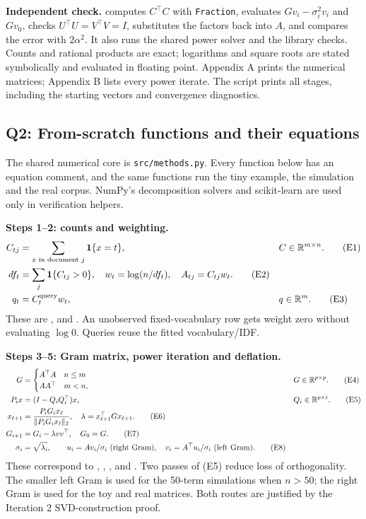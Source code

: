 \textbf{Independent check.}  computes $C^\top C$
with \texttt{Fraction}, evaluates $Gv_i-\sigma_i^2v_i$ and $Gv_0$,
checks $U^\top U=V^\top V=I$, substitutes the factors back into $A$,
and compares the error with $2\alpha^2$. It also runs the shared power
solver and the library checks. Counts and rational products are exact;
logarithms and square roots are stated symbolically and evaluated in
floating point. Appendix A prints the numerical matrices; Appendix B
lists every power iterate. The script prints all stages, including
the starting vectors and convergence diagnostics.

\subsection{Q2: From-scratch functions and their equations}
The shared numerical core is \texttt{src/methods.py}. Every function below
has an equation comment, and the same functions run the tiny example,
the simulation and the real corpus. NumPy's decomposition solvers and
scikit-learn are used only in verification helpers.

\textbf{Steps 1--2: counts and weighting.}
\begin{align}
C_{tj}&=\sum_{x\text{ in document }j}\mathbf1\{x=t\},
&& C\in\mathbb{R}^{m\times n}. \tag{E1}\\
df_t&=\sum_j\mathbf1\{C_{tj}>0\},\quad
w_t=\log(n/df_t),\quad A_{tj}=C_{tj}w_t. \tag{E2}\\
q_t&=C^{\mathrm{query}}_t w_t,
&&q\in\mathbb{R}^m. \tag{E3}
\end{align}
These are ,  and
. An unobserved fixed-vocabulary row gets weight
zero without evaluating $\log0$. Queries reuse the fitted vocabulary/IDF.

\textbf{Steps 3--5: Gram matrix, power iteration and deflation.}
\begin{align}
G&=\begin{cases}A^\top A&n\le m\\AA^\top&m<n,\end{cases}
&&G\in\mathbb{R}^{p\times p}. \tag{E4}\\
P_i x&=(I-Q_iQ_i^\top)x,
&&Q_i\in\mathbb{R}^{p\times i}. \tag{E5}\\
x_{\ell+1}&=\frac{P_iG_i x_\ell}{\|P_iG_i x_\ell\|_2},\quad
\lambda=x_{\ell+1}^\top Gx_{\ell+1}. \tag{E6}\\
G_{i+1}&=G_i-\lambda vv^\top,\quad G_0=G. \tag{E7}\\
\sigma_i&=\sqrt{\lambda_i},\qquad
u_i=Av_i/\sigma_i\ \text{(right Gram)},\quad
v_i=A^\top u_i/\sigma_i\ \text{(left Gram)}. \tag{E8}
\end{align}
These correspond to , ,
,  and
. Two passes of (E5) reduce loss of orthogonality.
The smaller left Gram is used for the 50-term simulations when $n>50$;
the right Gram is used for the toy and real matrices.
Both routes are justified by the Iteration 2 SVD-construction proof.

